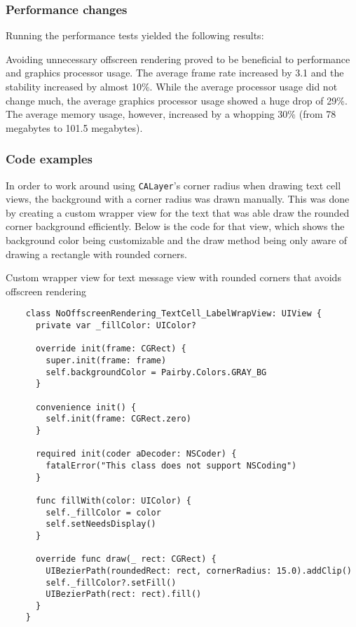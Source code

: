 \documentclass[a4paper,12pt]{article}
\begin{document}
\subsubsection*{Performance changes}
Running the performance tests yielded the following results:

Avoiding unnecessary offscreen rendering proved to be beneficial to performance and graphics processor usage. The average frame rate increased by 3.1 and the stability increased by almost 10\%. While the average processor usage did not change much, the average graphics processor usage showed a huge drop of 29\%. The average memory usage, however, increased by a whopping 30\% (from 78 megabytes to 101.5 megabytes). 

\subsubsection*{Code examples}
In order to work around using \texttt{CALayer}'s corner radius when drawing text cell views, the background with a corner radius was drawn manually. This was done by creating a custom wrapper view for the text that was able draw the rounded corner background efficiently. Below is the code for that view, which shows the background color being customizable and the draw method being only aware of drawing a rectangle with rounded corners.
\begin{listing}[H]
  \caption{Custom wrapper view for text message view with rounded corners that avoids offscreen rendering}
  \begin{verbatim}
    class NoOffscreenRendering_TextCell_LabelWrapView: UIView {
      private var _fillColor: UIColor?

      override init(frame: CGRect) {
        super.init(frame: frame)
        self.backgroundColor = Pairby.Colors.GRAY_BG
      }

      convenience init() {
        self.init(frame: CGRect.zero)
      }

      required init(coder aDecoder: NSCoder) {
        fatalError("This class does not support NSCoding")
      }

      func fillWith(color: UIColor) {
        self._fillColor = color
        self.setNeedsDisplay()
      }

      override func draw(_ rect: CGRect) {
        UIBezierPath(roundedRect: rect, cornerRadius: 15.0).addClip()
        self._fillColor?.setFill()
        UIBezierPath(rect: rect).fill()
      }
    }
  \end{verbatim}
\end{listing}
\end{document}
